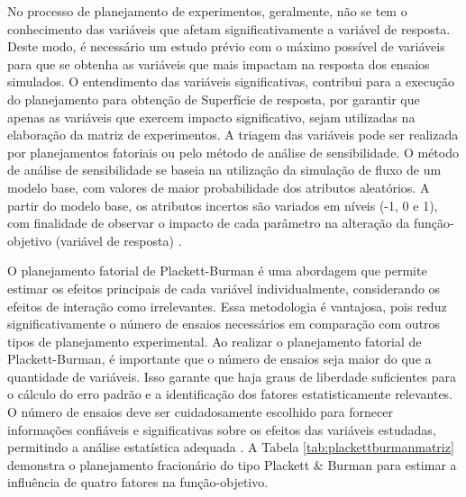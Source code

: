 No processo de planejamento de experimentos, geralmente, não se tem o conhecimento das variáveis que afetam significativamente a variável de resposta. Deste modo, é necessário um estudo prévio com o máximo possível de variáveis para que se obtenha as variáveis que mais impactam na resposta dos ensaios simulados. O entendimento das variáveis significativas, contribui para a execução do planejamento para obtenção de Superfície de resposta, por garantir que apenas as variáveis que exercem impacto significativo, sejam utilizadas na elaboração da matriz de experimentos. A triagem das variáveis pode ser realizada por planejamentos fatoriais ou pelo método de análise de sensibilidade. O método de análise de sensibilidade se baseia na utilização da simulação de fluxo de um modelo base, com valores de maior probabilidade dos atributos aleatórios. A partir do modelo base, os atributos incertos são variados em níveis (-1, 0 e 1), com finalidade de observar o impacto de cada parâmetro na alteração da função-objetivo (variável de resposta) \cite{risso1}.

O planejamento fatorial de Plackett-Burman é uma abordagem que permite estimar os efeitos principais de cada variável individualmente, considerando os efeitos de interação como irrelevantes. Essa metodologia é vantajosa, pois reduz significativamente o número de ensaios necessários em comparação com outros tipos de planejamento experimental. Ao realizar o planejamento fatorial de Plackett-Burman, é importante que o número de ensaios seja maior do que a quantidade de variáveis. Isso garante que haja graus de liberdade suficientes para o cálculo do erro padrão e a identificação dos fatores estatisticamente relevantes. O número de ensaios deve ser cuidadosamente escolhido para fornecer informações confiáveis e significativas sobre os efeitos das variáveis estudadas, permitindo a análise estatística adequada \cite{plackett}. A Tabela \ref{tab:plackettburmanmatriz} demonstra o planejamento fracionário do tipo Plackett & Burman para estimar a influência de quatro fatores na função-objetivo. 


